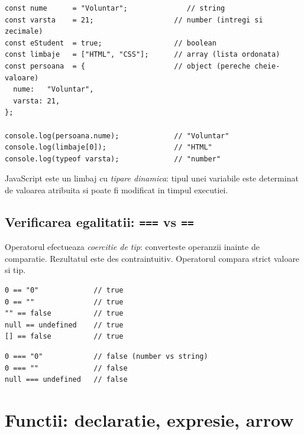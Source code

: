 \begin{lstlisting}[style=js]
const nume      = "Voluntar";              // string
const varsta    = 21;                   // number (intregi si zecimale)
const eStudent  = true;                 // boolean
const limbaje   = ["HTML", "CSS"];      // array (lista ordonata)
const persoana  = {                     // object (pereche cheie-valoare)
  nume:   "Voluntar",
  varsta: 21,
};

console.log(persoana.nume);             // "Voluntar"
console.log(limbaje[0]);                // "HTML"
console.log(typeof varsta);             // "number"
\end{lstlisting}

JavaScript este un limbaj cu \emph{tipare dinamica}: tipul unei variabile este determinat de valoarea atribuita si poate fi modificat in timpul executiei.

\subsection{Verificarea egalitatii: \texttt{===} vs \texttt{==}}

Operatorul \code{==} efectueaza \emph{coercitie de tip}: converteste operanzii inainte de comparatie. Rezultatul este des contraintuitiv. Operatorul \code{===} compara strict valoare si tip.

\begin{dano}[Asa nu \textendash{} \texttt{==}, coercitie surprinzatoare]
\begin{lstlisting}[style=js, numbers=none]
0 == "0"             // true
0 == ""              // true
"" == false          // true
null == undefined    // true
[] == false          // true
\end{lstlisting}
\end{dano}

\begin{dado}[Asa da \textendash{} \texttt{===} mereu]
\begin{lstlisting}[style=js, numbers=none]
0 === "0"            // false (number vs string)
0 === ""             // false
null === undefined   // false
\end{lstlisting}
\end{dado}

\section{Functii: declaratie, expresie, arrow}

